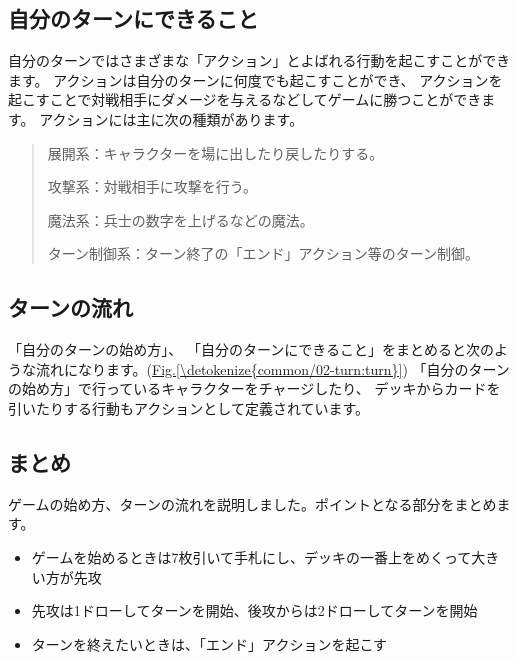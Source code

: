 \documentclass[letterpaper,10pt,dvipdfmx]{sphinxmanual}
\begin{document}
\subsection{自分のターンにできること}
\label{\detokenize{common/02-turn:id4}}
自分のターンではさまざまな「アクション」とよばれる行動を起こすことができます。
アクションは自分のターンに何度でも起こすことができ、
アクションを起こすことで対戦相手にダメージを与えるなどしてゲームに勝つことができます。
アクションには主に次の種類があります。
\begin{quote}

展開系：キャラクターを場に出したり戻したりする。

攻撃系：対戦相手に攻撃を行う。

魔法系：兵士の数字を上げるなどの魔法。

ターン制御系：ターン終了の「エンド」アクション等のターン制御。
\end{quote}


\subsection{ターンの流れ}
\label{\detokenize{common/02-turn:id5}}
「自分のターンの始め方」、
「自分のターンにできること」をまとめると次のような流れになります。(\hyperref[\detokenize{common/02-turn:turn}]{Fig.\@ \ref{\detokenize{common/02-turn:turn}}})
「自分のターンの始め方」で行っているキャラクターをチャージしたり、
デッキからカードを引いたりする行動もアクションとして定義されています。

\begin{figure}[htbp]
\centering

\noindent{}
\end{figure}


\subsection{まとめ}
\label{\detokenize{common/02-turn:id6}}
ゲームの始め方、ターンの流れを説明しました。ポイントとなる部分をまとめます。
\begin{itemize}
\item {} 
ゲームを始めるときは7枚引いて手札にし、デッキの一番上をめくって大きい方が先攻

\item {} 
先攻は1ドローしてターンを開始、後攻からは2ドローしてターンを開始

\item {} 
ターンを終えたいときは、「エンド」アクションを起こす

\end{itemize}
\end{document}
